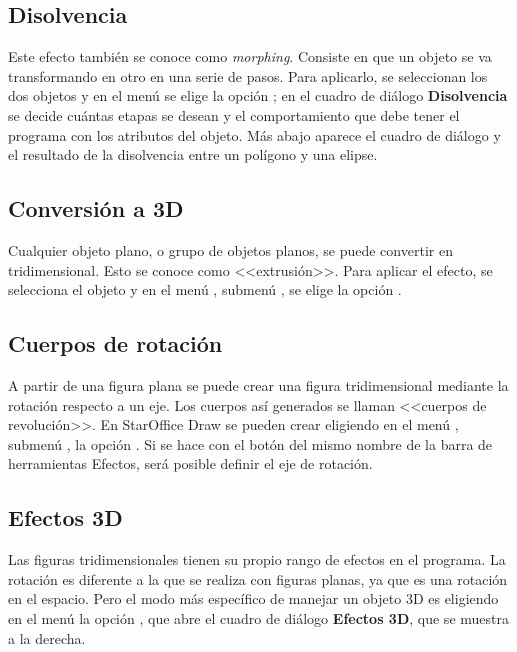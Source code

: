 \subsection{Disolvencia}

Este efecto también se conoce como \emph{morphing}. Consiste en que un
objeto se va transformando en otro en una serie de pasos. Para
aplicarlo, se seleccionan los dos objetos y en el menú 
se elige la opción ; en el cuadro de diálogo
\textbf{Disolvencia} se decide cuántas etapas se desean y el
comportamiento que debe tener el programa con los atributos del
objeto. Más abajo aparece el cuadro de diálogo y el resultado de la
disolvencia entre un polígono y una elipse.

\subsection{Conversión a 3D}

Cualquier objeto plano, o grupo de objetos planos, se puede convertir
en tridimensional. Esto se conoce como <<extrusión>>. Para aplicar el
efecto, se selecciona el objeto y en el menú , submenú
, se elige la opción .

\subsection{Cuerpos de rotación}

A partir de una figura plana se puede crear una figura tridimensional
mediante la rotación respecto a un eje. Los cuerpos así generados se
llaman <<cuerpos de revolución>>. En StarOffice Draw se pueden crear
eligiendo en el menú , submenú , la
opción . Si se hace con el botón del
mismo nombre de la barra de herramientas Efectos, será posible definir
el eje de rotación.

\subsection{Efectos 3D}

Las figuras tridimensionales tienen su propio rango de efectos en el
programa. La rotación es diferente a la que se realiza con figuras
planas, ya que es una rotación en el espacio. Pero el modo más
específico de manejar un objeto 3D es eligiendo en el menú
 la opción , que abre el cuadro de
diálogo \textbf{Efectos 3D}, que se muestra a la derecha.

